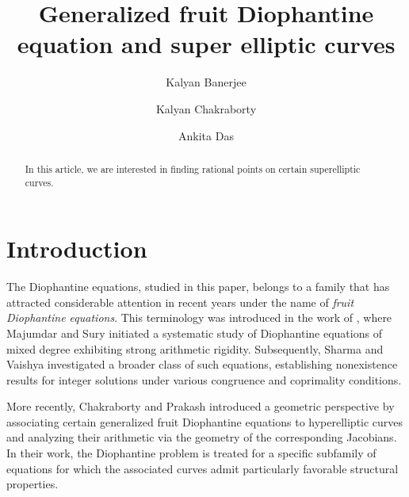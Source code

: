 \documentclass[12pt, reqno]{amsart}
\numberwithin{equation}{section}
\theoremstyle{definition}
\theoremstyle{nodefstyle}
\begin{document}
\title[Generalized fruit Diophantine equation and super elliptic curves]{Generalized fruit Diophantine equation and super elliptic curves}
\author{Kalyan Banerjee}
\address{Department of Mathematics, SRM University AP, Mangalagiri-Mandal, Amaravati-522240, Andhra Pradesh, India}

\author{Kalyan Chakraborty}
\address{Department of Mathematics, SRM University AP, Mangalagiri-Mandal, Amaravati-522240, Andhra Pradesh, India}

\author{Ankita Das}
\address{Department of Mathematics, SRM University AP, Mangalagiri-Mandal, Amaravati-522240, Andhra Pradesh, India}



\maketitle
\begin{abstract} In this article, we are interested in  finding rational points on certain superelliptic curves.

\end{abstract}

\section{Introduction}
The Diophantine equations, studied in this paper, belongs to a family that has attracted
considerable attention in recent years under the name of \emph{fruit Diophantine equations}.
This terminology was introduced in the work of
\cite{MajumdarSuryFruit}, where Majumdar and Sury initiated a systematic study
of Diophantine equations of mixed degree exhibiting strong arithmetic rigidity.
Subsequently, Sharma and Vaishya \cite{SharmaVaishyaFruit} investigated a broader class of
such equations, establishing nonexistence results for integer solutions under various
congruence and coprimality conditions.

More recently, Chakraborty and Prakash \cite{ChakrabortyPrakashFruit} introduced a
geometric perspective by associating certain generalized fruit Diophantine equations to
hyperelliptic curves and analyzing their arithmetic via the geometry of the corresponding
Jacobians. In their work, the Diophantine problem is treated for a specific subfamily of
equations for which the associated curves admit particularly favorable structural
properties.
\end{document}
